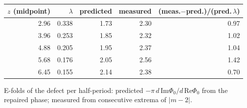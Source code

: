 \begin{tabular}{rrrrr}
\toprule
$z$ (midpoint) & $\lambda$ & predicted & measured & (meas.$-$pred.)/(pred.$\,\lambda$)\\
\midrule
2.96 & 0.338 & 1.73 & 2.30 & 0.97\\
3.96 & 0.253 & 1.85 & 2.32 & 1.02\\
4.88 & 0.205 & 1.95 & 2.37 & 1.04\\
5.68 & 0.176 & 2.05 & 2.56 & 1.42\\
6.45 & 0.155 & 2.14 & 2.38 & 0.70\\
\bottomrule
\end{tabular}

\smallskip\par\footnotesize E-folds of the defect per half-period: predicted $-\pi\,d\,\mathrm{Im}\Phi_0/d\,\mathrm{Re}\Phi_0$ from the repaired phase; measured from consecutive extrema of $|m-2|$.
